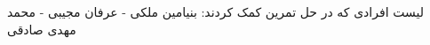 \documentclass[]{article}
\begin{document}
\pageheader

\noindent
لیست افرادی که در حل تمرین کمک کردند:
بنیامین ملکی - عرفان مجیبی - محمد مهدی صادقی






\end{document}
